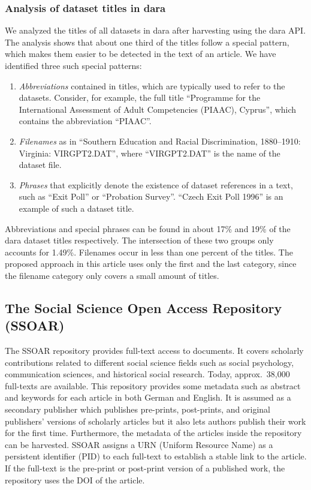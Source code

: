 \documentclass{IOS-Book-Article}
\newcommand{\dara}{\textsf{da\textbar ra}}
\begin{document}
\subsubsection{Analysis of dataset titles in {\dara}}
We analyzed the titles of all datasets in {\dara} after harvesting using the {\dara} API.
The analysis shows that about one third of the titles follow a special pattern, which makes them easier to be detected in the text of an article.
We have identified three such special patterns:
\begin{enumerate}
	\item \emph{Abbreviations} contained in titles, which are typically used to refer to the datasets. 
		Consider, for example, the full title \enquote{Programme for the International Assessment of Adult Competencies (PIAAC), Cyprus}, which contains the abbreviation \enquote{PIAAC}.
	\item \emph{Filenames} as in \enquote{Southern Education and Racial Discrimination, 1880--1910: Virginia: VIRGPT2.DAT}, where \enquote{VIRGPT2.DAT} is the name of the dataset file.
	\item \emph{Phrases} that explicitly denote the existence of dataset references in a text, such as \enquote{Exit Poll} or \enquote{Probation Survey}.
\enquote{Czech Exit Poll 1996} is an example of such a dataset title. 
\end{enumerate}

Abbreviations and special phrases can be found in about 17\% and 19\% of the {\dara} dataset titles respectively.
The intersection of these two groups only accounts for 1.49\%.
Filenames occur in less than one percent of the titles. 
The proposed approach in this article uses only the first and the last category, since the filename category only covers a small amount of titles.

\subsection{The Social Science Open Access Repository (SSOAR)}
The SSOAR repository provides full-text access to documents.
It covers scholarly contributions related to different social science fields such as social psychology, communication sciences, and historical social research.
Today, approx.\ 38,000 full-texts are available.
This repository provides some metadata such as abstract and keywords for each article in both German and English.
It is assumed as a secondary publisher which publishes pre-prints, post-prints, and original publishers' versions of scholarly articles but it also lets authors publish their work for the first time.
Furthermore, the metadata of the articles inside the repository can be harvested.
SSOAR assigns a URN (Uniform Resource Name) as a persistent identifier (PID) to each full-text to establish a stable link to the article.
If the full-text is the pre-print or post-print version of a published work, the repository uses the DOI of the article.
\end{document}
